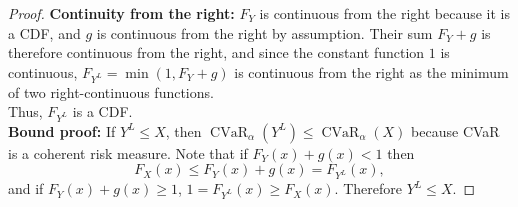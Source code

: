 \documentclass[acmlarge, manuscript, screen, review, natbib=false, oneside]{acmart}
\DeclareMathOperator{\CVaR}{CVaR}
\begin{document}
\begin{proof}
	\textbf{Continuity from the right:}
	$F_Y$ is continuous from the right because it is a CDF, and $g$ is continuous from the right by assumption. Their sum $F_Y + g$ is therefore continuous from the right, and since the constant function $1$ is continuous, $F_{Y^L} = \min(1, F_Y + g)$ is continuous from the right as the minimum of two right-continuous functions. \\
	Thus, $F_{Y^L}$ is a CDF. \\
	
	\textbf{Bound proof:}
	If $Y^L\leq X$, then $\CVaR_\alpha(Y^L)\leq \CVaR_\alpha(X)$ because CVaR is a coherent risk measure. Note that 
	if $F_Y(x) + g(x)<1$ then
	$$F_X(x)\leq F_Y(x) + g(x)=F_{Y^L}(x),$$
	and if $F_Y(x) + g(x)\geq 1$, $1=F_{Y^L}(x)\geq F_X(x)$. Therefore $Y^L\leq X$.
\end{proof}
\end{document}
